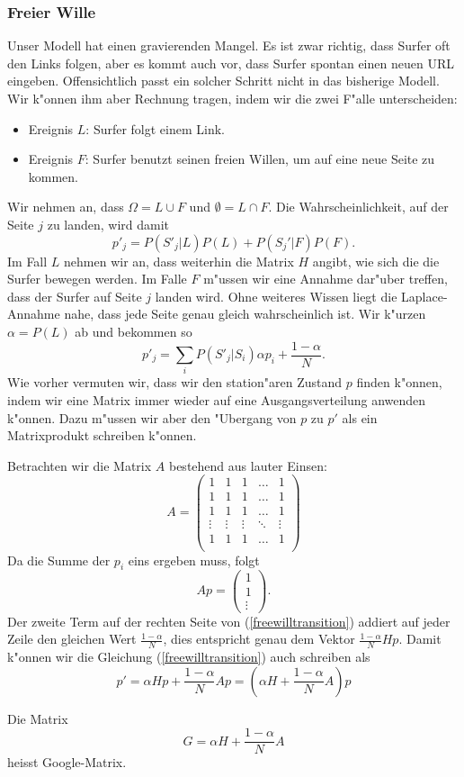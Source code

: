 \subsubsection{Freier Wille}
Unser Modell hat einen gravierenden Mangel.
Es ist zwar richtig, dass Surfer oft den
Links folgen, aber es kommt auch vor, dass
Surfer spontan einen neuen URL eingeben.
Offensichtlich passt ein solcher Schritt nicht in das bisherige Modell.
Wir k"onnen
ihm aber Rechnung tragen, indem wir die zwei F"alle unterscheiden:
\begin{itemize}
\item Ereignis $L$: Surfer folgt einem Link.
\item Ereignis $F$: Surfer benutzt seinen freien Willen,
um auf eine neue Seite zu kommen.
\end{itemize}
Wir nehmen an, dass $\Omega=L\cup F$ und $\emptyset=L\cap F$.
Die Wahrscheinlichkeit,
auf der Seite $j$ zu landen, wird damit
\[
p'_j=P(S'_j|L)P(L)+P(S_j'|F)P(F).
\]
Im Fall $L$ nehmen wir an, dass weiterhin die Matrix $H$ angibt, wie sich die
die Surfer bewegen werden.
Im Falle $F$ m"ussen wir eine Annahme dar"uber treffen,
dass der Surfer auf Seite $j$ landen wird.
Ohne weiteres Wissen liegt die Laplace-Annahme
nahe, dass jede Seite genau gleich wahrscheinlich ist.
Wir k"urzen $\alpha=P(L)$ ab und bekommen so
\begin{equation}
p'_j=\sum_{i}P(S'_j|S_i)\alpha p_i+\frac{1-\alpha}N.
\label{freewilltransition}
\end{equation}
Wie vorher vermuten wir, dass wir den station"aren Zustand $p$ finden k"onnen,
indem wir eine Matrix immer wieder auf eine Ausgangsverteilung anwenden k"onnen.
Dazu m"ussen wir aber den "Ubergang von $p$ zu $p'$ als ein Matrixprodukt
schreiben k"onnen.

Betrachten wir die Matrix $A$ bestehend aus lauter Einsen:
\[
A=\left(\begin{matrix}
1&1&1&\dots&1\\
1&1&1&\dots&1\\
1&1&1&\dots&1\\
\vdots&\vdots&\vdots&\ddots&\vdots\\
1&1&1&\dots&1\\
\end{matrix}\right)
\]
Da die Summe der $p_i$ eins ergeben muss, folgt
\[
Ap=\left(\begin{matrix}1\\1\\\vdots\end{matrix}\right).
\]
Der zweite Term auf der rechten Seite von (\ref{freewilltransition})
addiert auf jeder
Zeile den gleichen Wert $\frac{1-\alpha}{N}$, dies entspricht genau dem Vektor
$\frac{1-\alpha}{N}Hp$.
Damit k"onnen wir die Gleichung (\ref{freewilltransition}) auch schreiben als
\begin{equation}
p'=\alpha Hp + \frac{1-\alpha}{N}Ap = \left(\alpha H+\frac{1-\alpha}{N}A\right)p
\end{equation}
\begin{definition} Die Matrix
\[
G=
\alpha H+\frac{1-\alpha}{N}A
\]
heisst Google-Matrix.
\end{definition}

